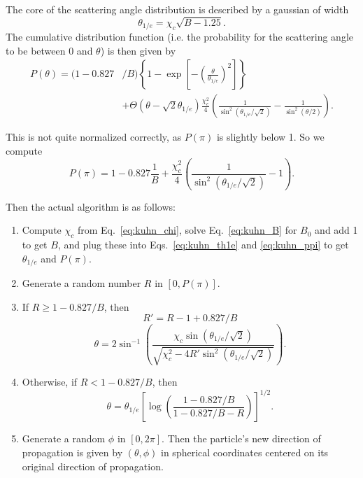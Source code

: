 \documentclass[11pt]{article}
\begin{document}
The core of the scattering angle distribution is described by a gaussian of width
\begin{equation}\label{eq:kuhn_th1e}
\theta_{1/e} = \chi_c\sqrt{B-1.25}.
\end{equation}
The cumulative distribution function (i.e. the probability for the scattering angle to be between 0 and $\theta$) is then given by
\begin{equation}
\begin{split}
P(\theta)=(1-0.827&/B)\left\{1-\exp\left[-\left(\frac{\theta}{\theta_{1/e}}\right)^2\right]\right\} \\
&+\Theta(\theta-\sqrt{2}\theta_{1/e})\frac{\chi_c^2}{4}\left(\frac{1}{\sin^2(\theta_{1/e}/\sqrt{2})}-\frac{1}{\sin^2(\theta/2)}\right).
\end{split}
\end{equation}

This is not quite normalized correctly, as $P(\pi)$ is slightly below 1. So we compute
\begin{equation}\label{eq:kuhn_ppi}
P(\pi) = 1-0.827\frac{1}{B}+\frac{\chi_c^2}{4}\left(\frac{1}{\sin^2(\theta_{1/e}/\sqrt{2})} - 1\right).
\end{equation}

Then the actual algorithm is as follows: 
\begin{enumerate}
\item Compute $\chi_c$ from Eq.~\ref{eq:kuhn_chi}, solve Eq.~\ref{eq:kuhn_B} for $B_0$ and add 1 to get $B$,
and plug these into Eqs.~\ref{eq:kuhn_th1e} and \ref{eq:kuhn_ppi} to get $\theta_{1/e}$ and $P(\pi)$.
\item Generate a random number $R$ in $[0,P(\pi)]$.
\item If $R\geq1-0.827/B$, then
\[
R' = R - 1 + 0.827/B
\]
\begin{equation}
\theta = 2\sin^{-1}\left(\frac{\chi_c\sin(\theta_{1/e}/\sqrt{2})}{\sqrt{\chi_c^2-4R'\sin^2(\theta_{1/e}/\sqrt{2})}}\right).
\end{equation}
\item Otherwise, if $R<1-0.827/B$, then
\begin{equation}
\theta = \theta_{1/e}\left[\log\left(\frac{1-0.827/B}{1-0.827/B-R}\right)\right]^{1/2}.
\end{equation}
\item Generate a random $\phi$ in $[0,2\pi]$. Then the particle's new direction of propagation is given by $(\theta,\phi)$ 
in spherical coordinates centered on its original direction of propagation.
\end{enumerate}
\end{document}
